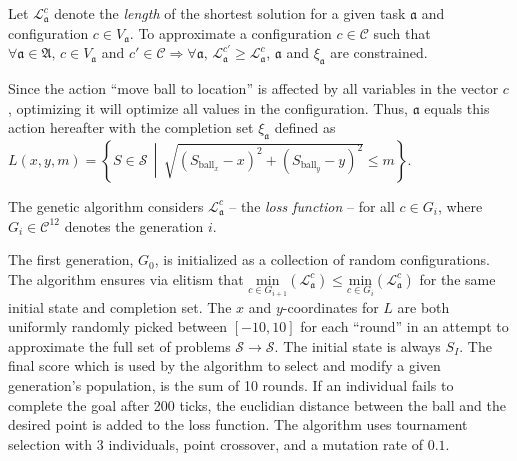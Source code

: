 
Let \(\mathscr{L}^c_\mathfrak{a}\) denote the \textit{length} of the shortest solution for a given task \(\mathfrak{a}\) and configuration \(c\in V_\mathfrak{a}\). To approximate a configuration \(c\in\mathcal{C}\) such that \( \forall \mathfrak{a}\in\mathfrak{A},\, c\in V_\mathfrak{a} \) and \(c'\in\mathcal{C} \Rightarrow \forall \mathfrak{a},\, \mathscr{L}^{c'}_\mathfrak{a} \ge \mathscr{L}^{c}_\mathfrak{a}\), \(\mathfrak{a}\) and \(\xi_\mathfrak{a}\) are constrained.

Since the action ``move ball to location'' is affected by all variables in the vector \(c\), optimizing it will optimize all values in the configuration. Thus, \(\mathfrak{a}\) equals this action hereafter with the completion set \(\xi_\mathfrak{a}\) defined as \(L(x,y,m) = \left\{ S \in \mathcal{S} \,\middle|\, \sqrt{ \left(S_{\text{ball}_x} - x\right)^2 + \left(S_{\text{ball}_y} - y\right)^2 } \le m \right\}\).

The genetic algorithm considers \(\mathscr{L}^{c}_\mathfrak{a}\) -- the \textit{loss function} -- for all \(c\in G_i\), where \(G_i\in\mathcal{C}^{12}\) denotes the generation \(i\).

The first generation, \(G_0\), is initialized as a collection of random configurations. The algorithm ensures via elitism that \(\underset{c\in G_{i+1}}{\text{min}}\left( \mathscr{L}^{c}_\mathfrak{a} \right) \le \underset{c\in G_{i}}{\text{min}}\left( \mathscr{L}^{c}_\mathfrak{a} \right)\) for the same initial state and completion set. The \(x\) and \(y\)-coordinates for \(L\) are both uniformly randomly picked between \([-10,10]\) for each ``round'' in an attempt to approximate the full set of problems \(\mathcal{S}\to\mathcal{S}\). The initial state is always \(S_I\). The final score which is used by the algorithm to select and modify a given generation's population, is the sum of 10 rounds. If an individual fails to complete the goal after 200 ticks, the euclidian distance between the ball and the desired point is added to the loss function. The algorithm uses tournament selection with 3 individuals, point crossover, and a mutation rate of \(0.1\).
